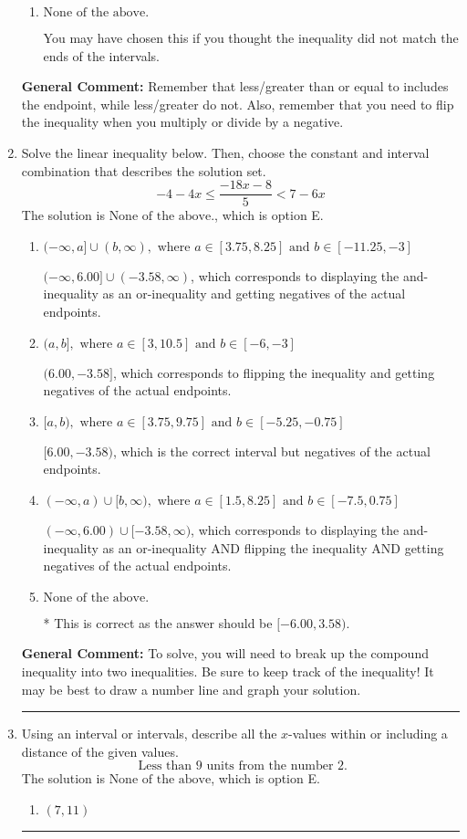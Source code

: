 \documentclass{extbook}[14pt]
\newcommand{\litem}[1]{\item #1

\rule{\textwidth}{0.4pt}}
\begin{document}
\begin{enumerate}
{\begin{enumerate}[label=\Alph*.]
 $[1.778, \infty)$, which corresponds to switching the direction of the interval. You likely did this if you did not flip the inequality when dividing by a negative!
\item \( \text{None of the above}. \)

You may have chosen this if you thought the inequality did not match the ends of the intervals.
\end{enumerate}

\textbf{General Comment:} Remember that less/greater than or equal to includes the endpoint, while less/greater do not. Also, remember that you need to flip the inequality when you multiply or divide by a negative.
}
\litem{
Solve the linear inequality below. Then, choose the constant and interval combination that describes the solution set.
\[ -4 - 4 x \leq \frac{-18 x - 8}{5} < 7 - 6 x \]The solution is \( \text{None of the above.} \), which is option E.\begin{enumerate}[label=\Alph*.]
\item \( (-\infty, a] \cup (b, \infty), \text{ where } a \in [3.75, 8.25] \text{ and } b \in [-11.25, -3] \)

$(-\infty, 6.00] \cup (-3.58, \infty)$, which corresponds to displaying the and-inequality as an or-inequality and getting negatives of the actual endpoints.
\item \( (a, b], \text{ where } a \in [3, 10.5] \text{ and } b \in [-6, -3] \)

$(6.00, -3.58]$, which corresponds to flipping the inequality and getting negatives of the actual endpoints.
\item \( [a, b), \text{ where } a \in [3.75, 9.75] \text{ and } b \in [-5.25, -0.75] \)

$[6.00, -3.58)$, which is the correct interval but negatives of the actual endpoints.
\item \( (-\infty, a) \cup [b, \infty), \text{ where } a \in [1.5, 8.25] \text{ and } b \in [-7.5, 0.75] \)

$(-\infty, 6.00) \cup [-3.58, \infty)$, which corresponds to displaying the and-inequality as an or-inequality AND flipping the inequality AND getting negatives of the actual endpoints.
\item \( \text{None of the above.} \)

* This is correct as the answer should be $[-6.00, 3.58)$.
\end{enumerate}

\textbf{General Comment:} To solve, you will need to break up the compound inequality into two inequalities. Be sure to keep track of the inequality! It may be best to draw a number line and graph your solution.
}
\litem{
Using an interval or intervals, describe all the $x$-values within or including a distance of the given values.
\[ \text{ Less than } 9 \text{ units from the number } 2. \]The solution is \( \text{None of the above} \), which is option E.\begin{enumerate}[label=\Alph*.]
\item \( (7, 11) \)


\end{enumerate}}
\end{enumerate}
\end{document}

